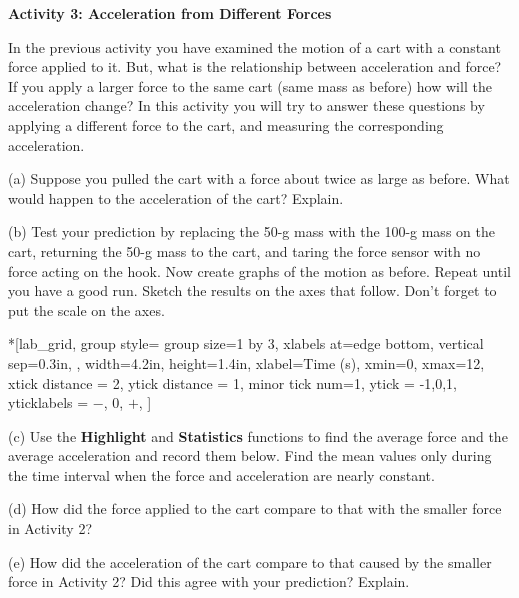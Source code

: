 \textbf{Activity 3: Acceleration from Different Forces }

In the previous activity you have examined the motion of a cart with a constant
force applied to it. But, what is the relationship between acceleration and
force? If you apply a larger force to the same cart (same mass as before) how
will the acceleration change? In this activity you will try to answer these
questions by applying a different force to the cart, and measuring the corresponding
acceleration. 

(a) Suppose you pulled the cart with a force about twice as large as before.
What would happen to the acceleration of the cart? Explain.
\answerspace{20mm}

\pagebreak[3]
(b) Test your prediction by replacing the 50-g mass with the 100-g mass on the cart, 
returning the 50-g mass to the cart, and taring the force sensor with no force acting on the hook.
Now create graphs of the motion as before. 
Repeat until you have a good run. Sketch the
results on the axes that follow. Don't forget to put the scale on the axes.

\begin{lab_groupplot}*{}[lab_grid,
	group style={
		group size=1 by 3,
		xlabels at=edge bottom,
		vertical sep=0.3in,
		},
	width=4.2in,  height=1.4in,
	xlabel=Time (s),
	xmin=0, xmax=12,
	xtick distance = 2, 
	ytick distance = 1, 
	minor tick num=1,
	ytick = {-1,0,1},
	yticklabels = {$-$, 0, $+$},
	]
\nextgroupplot[
	ymin=-1,ymax=1, 
	ylabel={Velocity (m/s)},
	]
\nextgroupplot[
	ymin=-1,ymax=1, 
	ylabel={Acceleration (m/s$^2$)},
	]
\nextgroupplot[
	ymin=-1,ymax=1, 
	ylabel={Force (N)},
	]
\end{lab_groupplot}


(c) Use the \textbf{Highlight} and  \textbf{Statistics} functions to find the 
average force and the average acceleration
and record them below. Find the mean values only during the time interval when
the force and acceleration are nearly constant.
\answerspace{15mm}

(d) How did the force applied to the cart compare to that with the smaller force
in Activity 2?
\answerspace{15mm}

(e) How did the acceleration of the cart compare to that caused by the smaller
force in Activity 2? Did this agree with your prediction? Explain.
\answerspace{15mm}

